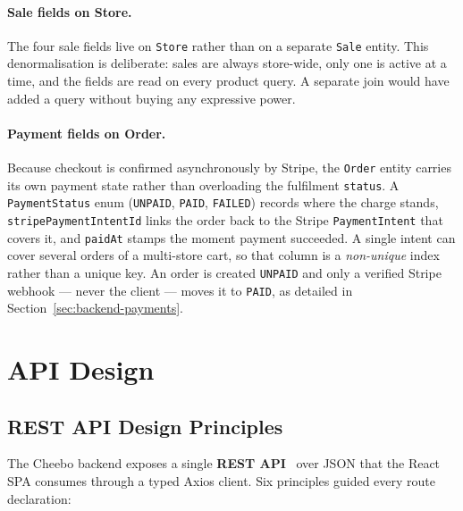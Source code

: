 \documentclass[12pt, a4paper, oneside]{report}
\begin{document}
\paragraph{Sale fields on Store.}
The four sale fields live on \texttt{Store} rather than on a
separate \texttt{Sale} entity. This denormalisation is deliberate:
sales are always store-wide, only one is active at a time, and the
fields are read on every product query. A separate join would have
added a query without buying any expressive power.

\paragraph{Payment fields on Order.}
Because checkout is confirmed asynchronously by Stripe, the
\texttt{Order} entity carries its own payment state rather than
overloading the fulfilment \texttt{status}. A \texttt{PaymentStatus}
enum (\texttt{UNPAID}, \texttt{PAID}, \texttt{FAILED}) records where
the charge stands, \texttt{stripePaymentIntentId} links the order back
to the Stripe \texttt{PaymentIntent} that covers it, and
\texttt{paidAt} stamps the moment payment succeeded. A single intent
can cover several orders of a multi-store cart, so that column is a
\emph{non-unique} index rather than a unique key. An order is created
\texttt{UNPAID} and only a verified Stripe webhook --- never the
client --- moves it to \texttt{PAID}, as detailed in
Section~\ref{sec:backend-payments}.

\section{API Design}

\subsection{REST API Design Principles}

The Cheebo backend exposes a single \textbf{REST API}~\cite{fielding}
over JSON
that the React SPA consumes through a typed Axios client. Six
principles guided every route declaration:
\end{document}

